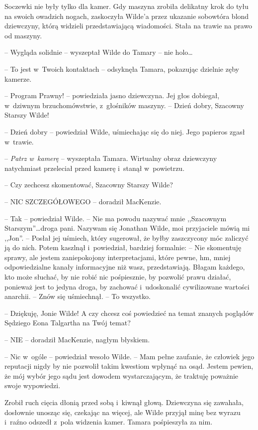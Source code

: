 \documentclass[oneside,polish,11pt,sfheadings]{mwbk}
\begin{document}
Soczewki nie były tylko dla kamer. Gdy maszyna zrobiła delikatny krok do
tyłu na swoich owadzich nogach, zaskoczyła Wilde'a przez ukazanie
sobowtóra blond dziewczyny, którą widzieli przedstawiającą wiadomości.
Stała na trawie na prawo od maszyny.

-- Wygląda solidnie -- wyszeptał Wilde do Tamary -- nie holo\ldots

-- To jest w~Twoich kontaktach -- odsyknęła Tamara, pokazując dzielnie
zęby kamerze.

-- Program Prawny! -- powiedziała jasno dziewczyna. Jej głos dobiegał, w~dziwnym brzuchomówstwie, z~głośników maszyny. -- Dzień dobry, Szacowny
Starszy Wilde!

-- Dzień dobry -- powiedział Wilde, uśmiechając się do niej. Jego papieros
zgasł w~trawie.

-- \emph{Patrz w~kamerę} -- wyszeptała Tamara. Wirtualny obraz dziewczyny
natychmiast przeleciał przed kamerę i~stanął w~powietrzu.

-- Czy zechcesz skomentować, Szacowny Starszy Wilde?

-- NIC SZCZEGÓŁOWEGO -- doradził MacKenzie.

-- Tak -- powiedział Wilde. -- Nie ma powodu nazywać mnie ,,Szacownym
Starszym''\ldots droga pani. Nazywam się Jonathan Wilde, moi przyjaciele
mówią mi ,,Jon''. -- Posłał jej uśmiech, który sugerował, że byłby
zaszczycony móc zaliczyć ją do nich. Potem kaszlnął i~powiedział,
bardziej formalnie: -- Nie skomentuję sprawy, ale jestem zaniepokojony
interpretacjami, które pewne, hm, mniej odpowiedzialne kanały
informacyjne niż wasz, przedstawiają. Błagam każdego, kto może słuchać,
by nie robić nic pośpiesznie, by pozwolić prawu działać, ponieważ jest
to jedyna droga, by zachować i~udoskonalić cywilizowane wartości
anarchii. -- Znów się uśmiechnął. -- To wszystko.

-- Dziękuję, Jonie Wilde! A czy chcesz coś powiedzieć na temat znanych
poglądów Sędziego Eona Talgartha na Twój temat?

-- NIE -- doradził MacKenzie, nagłym błyskiem.

-- Nic w~ogóle -- powiedział wesoło Wilde. -- Mam pełne zaufanie, że
człowiek jego reputacji nigdy by nie pozwolił takim kwestiom wpłynąć na
osąd. Jestem pewien, że mój wybór jego sądu jest dowodem wystarczającym,
że traktuję poważnie swoje wypowiedzi.

Zrobił ruch cięcia dłonią przed sobą i~kiwnął głową. Dziewczyna się
zawahała, dosłownie unosząc się, czekając na więcej, ale Wilde przyjął
minę bez wyrazu i~raźno odszedł z~pola widzenia kamer. Tamara
pośpieszyła za nim.
\end{document}
